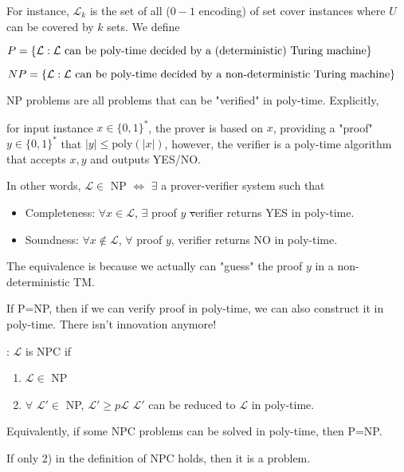 For instance, $ \mathcal{L}_k $  is the set of all ($ 0-1 $ encoding) of set cover instances where  $ U  $ can be covered by  $ k  $ sets. We define 
\begin{center}
    $ \displaystyle P=\{\mathcal{L}:\mathcal{L}\text{ can be poly-time decided by a (deterministic) Turing machine}\} $ 
\end{center}
\begin{center}
    $ \displaystyle NP=\{\mathcal{L}:\mathcal{L}\text{ can be poly-time decided by a non-deterministic Turing machine}\} $
\end{center}

NP problems are all problems that can be "verified" in poly-time. Explicitly,

for input instance  $ x\in \{0,1\}^\ast $, the prover is based on  $ x $, providing a "proof"  $ y\in \{0,1\}^\ast $ that  $ |y| \leq \mathrm{poly}(|x|) $, however, the verifier is a poly-time algorithm that accepts   $ x,y  $ and outputs YES/NO.

In other words,  $ \mathcal{L}\in  $ NP  $ \Leftrightarrow $   $ \exists $ a prover-verifier system such that 
\begin{itemize}
    \item Completeness:  $ \forall x\in \mathcal{L} $,  $ \exists $ proof $ y $ \st verifier returns YES in poly-time.
    \item Soundness: $ \forall x\not\in \mathcal{L} $, $ \forall  $  proof  $ y $, verifier returns  NO in poly-time.     
\end{itemize} 
The equivalence is because we actually can "guess" the proof  $ y  $ in a non-deterministic TM.

If P=NP, then if we can verify  proof in poly-time, we can also construct it in poly-time. There isn't innovation anymore!

:  $ \mathcal{L} $ is NPC if 
\begin{enumerate}[label=\arabic*)]
    \item  $ \mathcal{L}\in  $ NP 
    \item  $ \forall  $  $ \mathcal{L}'\in  $ NP,  $ \mathcal{L}' \geq p\mathcal{L} $ \ie  $ \mathcal{L}' $ can be reduced to  $ \mathcal{L} $ in poly-time.      
\end{enumerate} 

Equivalently, if some NPC problems can be solved in poly-time, then P=NP.

If only 2) in the definition of NPC holds, then it is a  problem.